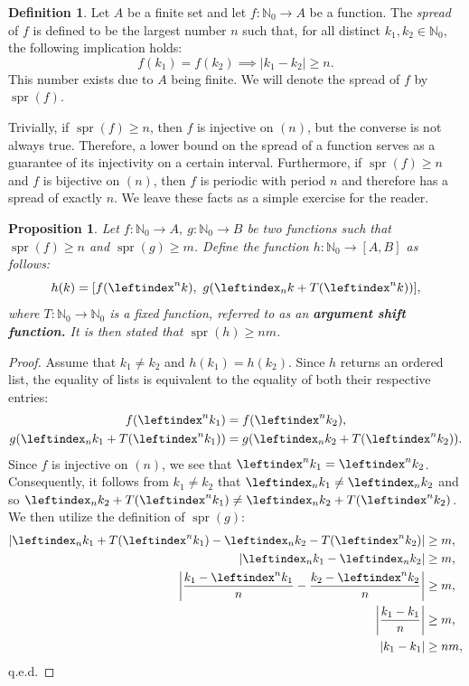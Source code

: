 \documentclass[a4paper, 10pt]{article}
\theoremstyle{plain}
\newtheorem{proposition}[theorem]{Proposition}
\theoremstyle{definition}
\newtheorem{definition}[theorem]{Definition}
\newcommand{\N}{\mathbb{N}}
\newcommand{\li}{\leftindex}
\newcommand{\spr}[1]{\operatorname{spr}(#1)}
\begin{document}
\begin{definition}
  Let $A$ be a finite set and let $f \colon \N_0 \to A$ be a function. The \emph{spread} of $f$ is defined to be the largest number $n$ such that, for all distinct $k_1, k_2 \in \N_0$, the following implication holds:
  \[
    f(k_1) = f(k_2) \implies |k_1 - k_2| \geq n.
  \]
  This number exists due to $A$ being finite. We will denote the spread of $f$ by $\spr{f}$.\\
\end{definition}

Trivially, if $\spr{f} \geq n$, then $f$ is injective on $(n)$, but the converse is not always true. Therefore, a lower bound on the spread of a function serves as a guarantee of its injectivity on a certain interval. Furthermore, if $\spr{f} \geq n$ and $f$ is bijective on $(n)$, then $f$ is periodic with period $n$ and therefore has a spread of exactly $n$. We leave these facts as a simple exercise for the reader.\\

\begin{proposition}
  \label{map}
  Let $f \colon \N_0 \to A,\ g \colon \N_0 \to B$ be two functions such that $\spr{f} \geq n$ and $\spr{g} \geq m$. Define the function $h \colon \N_0 \to [A,B]$ as follows:
  \[
    h(k) = [f(\li^n k),\ g(\li_n k + T(\li^n k))],
  \]
  where $T \colon \N_0 \to \N_0$ is a fixed function, referred to as an \textbf{argument shift function.} It is then stated that $\spr{h} \geq n m$.
\end{proposition}
\begin{proof}
  Assume that $k_1 \ne k_2$ and $h(k_1) = h(k_2)$. Since $h$ returns an ordered list, the equality of lists is equivalent to the equality of both their respective entries:
  \begin{align*}
    f(\li^n k_1) &= f(\li^n k_2),\\
    g(\li_n k_1 + T(\li^n k_1)) &= g(\li_n k_2 + T(\li^n k_2)).
  \end{align*}
  Since $f$ is injective on $(n)$, we see that $\li^n k_1 = \li^n k_2$. Consequently, it follows from $k_1 \ne k_2$ that $\li_n k_1 \ne \li_n k_2$ and so $\li_n k_2 + T(\li^n k_1) \ne \li_n k_2 + T(\li^n k_2)$. We then utilize the definition of $\spr{g}$:
  \begin{align*}
    |\li_n k_1 + T(\li^n k_1) - \li_n k_2 - T(\li^n k_2)| &\ge m,\\
    |\li_n k_1 - \li_n k_2| &\ge m,\\
    \left| \frac{k_1 - \li^n k_1}{n} - \frac{k_2 - \li^n k_2}{n} \right| &\ge m,\\
    \left| \frac{k_1 - k_1}{n} \right| &\ge m,\\
    | k_1 - k_1 | &\ge n m,\\
  \end{align*}
  q.e.d.
\end{proof}
\end{document}
